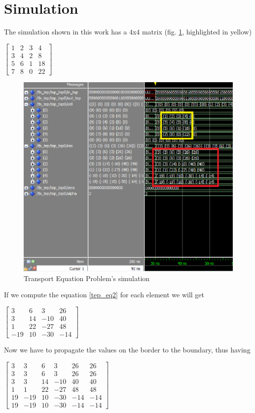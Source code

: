 \clearpage
\newpage
\section{Simulation}
The simulation shown in this work has a 4x4 matrix  (fig. \ref{fig:tep_sim}, highlighted in yellow)
\begin{center}
	$\begin{bmatrix}
	1 & 2& 3&4\\
	3&4&2&8\\
	5&6&1&18\\
	7&8&0&22
	\end{bmatrix}$
\end{center}
\begin{figure}[h!]
	\centering
	\includegraphics[width=\textwidth]{imm/tep/wave_t.png}  
	\caption{Transport Equation Problem's simulation} 
	\label{fig:tep_sim}
\end{figure}
\bigskip
If we compute the equation \ref{tep_eq2} for each element we will get 
\begin{center}
	$\begin{bmatrix}
	3 & 6& 3&26\\
	3&14&-10&40\\
	1&22&-27&48\\
	-19&10&-30&-14
	\end{bmatrix}$
\end{center}
\bigskip
Now we have to propagate the values on the border to the boundary, thus having
\begin{center}
	$\begin{bmatrix}
	3&3 & 6& 3&26&26\\
	3&3 & 6& 3&26&26\\
	3&3&14&-10&40&40\\
	1&1&22&-27&48&48\\
	19&-19&10&-30&-14&-14\\
	19&-19&10&-30&-14&-14
	\end{bmatrix}$
\end{center}